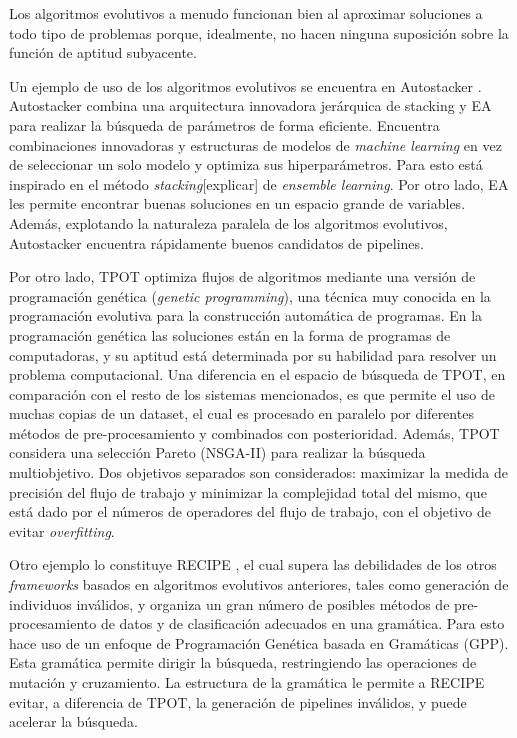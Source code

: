 Los algoritmos evolutivos a menudo funcionan bien al aproximar soluciones a todo tipo de problemas porque, idealmente, no hacen ninguna suposición sobre la función de aptitud subyacente. %

Un ejemplo de uso de los algoritmos evolutivos se encuentra en Autostacker \cite{chen2018autostacker}. Autostacker combina una arquitectura innovadora jerárquica de stacking y EA para realizar la búsqueda de parámetros de forma eficiente. Encuentra combinaciones innovadoras y estructuras de modelos de \textit{machine learning} en vez de seleccionar un solo modelo y optimiza sus hiperparámetros. Para esto está inspirado en el método \textit{stacking}[explicar] de \textit{ensemble learning}\cite{wolpert1992stacked, breiman1996stacked}. Por otro lado, EA les permite encontrar buenas soluciones en un espacio grande de variables. Además, explotando la naturaleza paralela de los algoritmos evolutivos, Autostacker encuentra rápidamente buenos candidatos de pipelines.

Por otro lado, TPOT \cite{olson2019tpot} optimiza flujos de algoritmos mediante una versión de programación genética (\textit{genetic programming}), una técnica muy conocida en la programación evolutiva para la construcción automática de programas. En la programación genética las soluciones están en la forma de programas de computadoras, y su aptitud está determinada por su habilidad para resolver un problema computacional. Una diferencia en el espacio de búsqueda de TPOT, en comparación con el resto de los sistemas mencionados, es que permite el uso de muchas copias de un dataset, el cual es procesado en paralelo por diferentes métodos de pre-procesamiento y combinados con posterioridad. Además, TPOT considera una selección Pareto (NSGA-II) \cite{NSGA-II} para realizar la búsqueda multiobjetivo. Dos objetivos separados son considerados: maximizar la medida de precisión del flujo de trabajo y minimizar la complejidad total del mismo, que está dado por el números de operadores del flujo de trabajo, con el objetivo de evitar \textit{overfitting}.

Otro ejemplo lo constituye RECIPE \cite{de2017recipe}, el cual supera las debilidades de los otros \textit{frameworks} basados en algoritmos evolutivos anteriores, tales como generación de individuos inválidos, y organiza un gran número de posibles métodos de pre-procesamiento de datos y de clasificación adecuados en una gramática. Para esto hace uso de un enfoque de Programación Genética basada en Gramáticas (GPP). Esta gramática permite dirigir la búsqueda, restringiendo las operaciones de mutación y cruzamiento. La estructura de la gramática le permite a RECIPE evitar, a diferencia de TPOT, la generación de pipelines inválidos, y puede acelerar la búsqueda.

